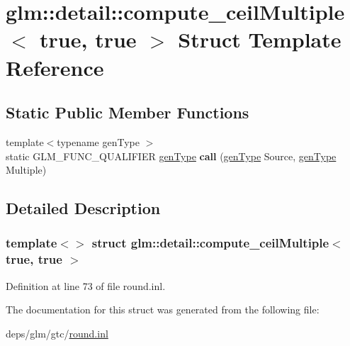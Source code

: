 \hypertarget{structglm_1_1detail_1_1compute__ceilMultiple_3_01true_00_01true_01_4}{}\section{glm\+:\+:detail\+:\+:compute\+\_\+ceil\+Multiple$<$ true, true $>$ Struct Template Reference}
\label{structglm_1_1detail_1_1compute__ceilMultiple_3_01true_00_01true_01_4}
\subsection*{Static Public Member Functions}
\begin{DoxyCompactItemize}
\item 
\mbox{\label{structglm_1_1detail_1_1compute__ceilMultiple_3_01true_00_01true_01_4_a6d9103207c947da13d0319d2d4d071d9}} 
{\footnotesize template$<$typename gen\+Type $>$ }\\static G\+L\+M\+\_\+\+F\+U\+N\+C\+\_\+\+Q\+U\+A\+L\+I\+F\+I\+ER \hyperlink{structglm_1_1detail_1_1genType}{gen\+Type} {\bfseries call} (\hyperlink{structglm_1_1detail_1_1genType}{gen\+Type} Source, \hyperlink{structglm_1_1detail_1_1genType}{gen\+Type} Multiple)
\end{DoxyCompactItemize}


\subsection{Detailed Description}
\subsubsection*{template$<$$>$\newline
struct glm\+::detail\+::compute\+\_\+ceil\+Multiple$<$ true, true $>$}



Definition at line 73 of file round.\+inl.



The documentation for this struct was generated from the following file\+:\begin{DoxyCompactItemize}
\item 
deps/glm/gtc/\hyperlink{round_8inl}{round.\+inl}\end{DoxyCompactItemize}
